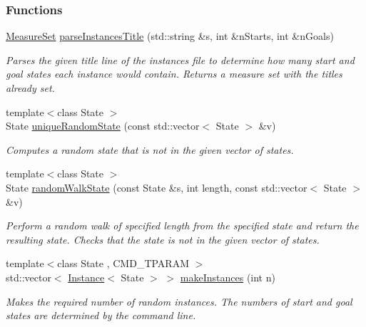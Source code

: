 \subsubsection*{Functions}
\begin{DoxyCompactItemize}
\item 
\hyperlink{structslb_1_1core_1_1sb_1_1MeasureSet}{Measure\+Set} \hyperlink{namespaceslb_1_1core_1_1sb_a1866330cbea23527482f996faad8b3c4}{parse\+Instances\+Title} (std\+::string \&s, int \&n\+Starts, int \&n\+Goals)
\begin{DoxyCompactList}\small\item\em Parses the given title line of the instances file to determine how many start and goal states each instance would contain. Returns a measure set with the titles already set. \end{DoxyCompactList}\item 
{\footnotesize template$<$class State $>$ }\\State \hyperlink{namespaceslb_1_1core_1_1sb_a68dfc95bb83fc37be7bbaf9d8ea14557}{unique\+Random\+State} (const std\+::vector$<$ State $>$ \&v)
\begin{DoxyCompactList}\small\item\em Computes a random state that is not in the given vector of states. \end{DoxyCompactList}\item 
{\footnotesize template$<$class State $>$ }\\State \hyperlink{namespaceslb_1_1core_1_1sb_a8e97884bbdba52e74db4baf3fd5cd561}{random\+Walk\+State} (const State \&s, int length, const std\+::vector$<$ State $>$ \&v)
\begin{DoxyCompactList}\small\item\em Perform a random walk of specified length from the specified state and return the resulting state. Checks that the state is not in the given vector of states. \end{DoxyCompactList}\item 
{\footnotesize template$<$class State , C\+M\+D\+\_\+\+T\+P\+A\+R\+AM $>$ }\\std\+::vector$<$ \hyperlink{structslb_1_1core_1_1sb_1_1Instance}{Instance}$<$ State $>$ $>$ \hyperlink{namespaceslb_1_1core_1_1sb_a7f194d59f1e10da41faa6d30644e1e06}{make\+Instances} (int n)
\begin{DoxyCompactList}\small\item\em Makes the required number of random instances. The numbers of start and goal states are determined by the command line. \end{DoxyCompactList}\item 

\end{DoxyCompactItemize}
